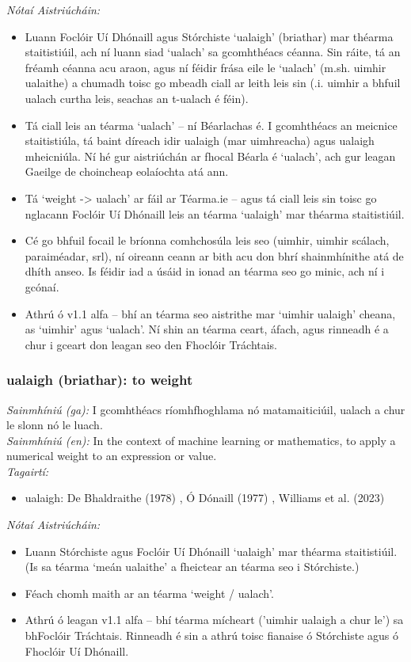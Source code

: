 \documentclass{article}
\begin{document}
 \noindent \textit{Nótaí Aistriúcháin:}
\begin{itemize}
	\item Luann Foclóir Uí Dhónaill agus Stórchiste `ualaigh' (briathar) mar théarma staitistiúil, ach ní luann siad `ualach' sa gcomhthéacs céanna. Sin ráite, tá an fréamh céanna acu araon, agus ní féidir frása eile le `ualach' (m.sh. uimhir ualaithe) a chumadh toisc go mbeadh ciall ar leith leis sin (.i. uimhir a bhfuil ualach curtha leis, seachas an t-ualach é féin).
	\item Tá ciall leis an téarma `ualach' -- ní Béarlachas é. I gcomhthéacs an meicnice staitistiúla, tá baint díreach idir ualaigh (mar uimhreacha) agus ualaigh mheicniúla. Ní hé gur aistriúchán ar fhocal Béarla é `ualach', ach gur leagan Gaeilge de choincheap eolaíochta atá ann.
	\item Tá `weight -> ualach' ar fáil ar Téarma.ie -- agus tá ciall leis sin toisc go nglacann Foclóir Uí Dhónaill leis an téarma `ualaigh' mar théarma staitistiúil. 
	\item Cé go bhfuil focail le bríonna comhchosúla leis seo (uimhir, uimhir scálach, paraiméadar, srl), ní oireann ceann ar bith acu don bhrí shainmhínithe atá de dhíth anseo. Is féidir iad a úsáid in ionad an téarma seo go minic, ach ní i gcónaí.
	\item Athrú ó v1.1 alfa -- bhí an téarma seo aistrithe mar `uimhir ualaigh' cheana, as `uimhir' agus `ualach'. Ní shin an téarma ceart, áfach, agus rinneadh é a chur i gceart don leagan seo den Fhoclóir Tráchtais.
\end{itemize}


\subsubsection*{ualaigh (briathar): to weight}
 \noindent \textit{Sainmhíniú (ga):} I gcomhthéacs ríomhfhoghlama nó matamaiticiúil, ualach a chur le slonn nó le luach.
\\
 \noindent \textit{Sainmhíniú (en):} In the context of machine learning or mathematics, to apply a numerical weight to an expression or value.
\\
 \noindent \textit{Tagairtí:}
\begin{itemize}
	\item ualaigh: De Bhaldraithe (1978) \cite{de-bhaldraithe}, Ó Dónaill (1977) \cite{odonaill}, Williams et al. (2023) \cite{storchiste}
\end{itemize}

 \noindent \textit{Nótaí Aistriúcháin:}
\begin{itemize}
	\item Luann Stórchiste agus Foclóir Uí Dhónaill `ualaigh' mar théarma staitistiúil. (Is sa téarma `meán ualaithe' a fheictear an téarma seo i Stórchiste.)
	\item Féach chomh maith ar an téarma `weight / ualach'.
	\item Athrú ó leagan v1.1 alfa -- bhí téarma mícheart ('uimhir ualaigh a chur le') sa bhFoclóir Tráchtais. Rinneadh é sin a athrú toisc fianaise ó Stórchiste agus ó Fhoclóir Uí Dhónaill.
\end{itemize}
\end{document}
